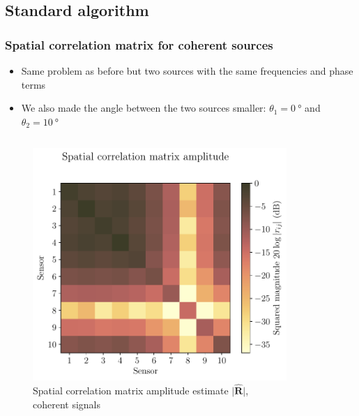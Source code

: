 \documentclass[UKenglish,8pt,aspectratio=1610]{beamer}
\begin{document}
\subsection{Standard algorithm}
\begin{frame}
	\frametitle{Spatial correlation matrix for coherent sources \cite{twoDecades,uncini,Johnson1993ArraySP}}
\begin{itemize}
	\item Same problem as before but two sources with the same frequencies and phase terms
	\item We also made the angle between the two sources smaller: $\theta_1=0~\si{\degree}$ and $\theta_2=10~\si{\degree}$
\end{itemize}
	\begin{columns}
	\begin{column}{0.5\textwidth}
		\begin{figure}[h!]
			\centering
			\includegraphics[scale=0.45]{question8/matrices/spatial_correlation_matrix_amplitude.pdf}
			\caption{Spatial correlation matrix amplitude estimate $\rvert \boldsymbol{\hat{\mathbf{R}}}\rvert$, coherent signals}
		\end{figure}
	\end{column}
	\begin{column}{0.5\textwidth}
		\begin{figure}[h!]
			\centering

\end{figure}
\end{column}
\end{columns}
\end{frame}
\end{document}
